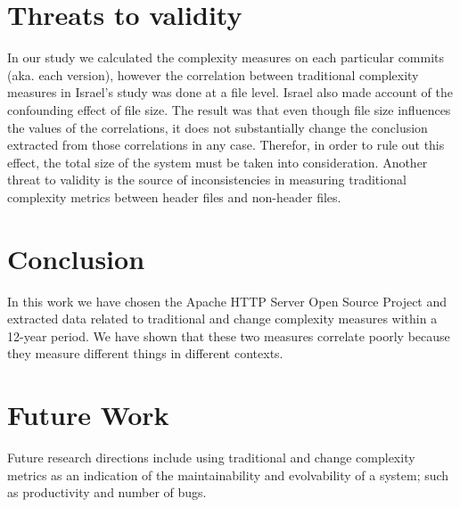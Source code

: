 \documentclass[9pt,twocolumn,a4paper]{article}
\begin{document}
\section{Threats to validity}
In our study we calculated the complexity measures on each particular commits (aka. each version), however the correlation between traditional complexity measures in Israel's study \cite{Israel} was done at a file level. Israel also made account of the confounding effect of file size. The result was that even though file size influences the values of the correlations, it does not substantially change the conclusion extracted from those correlations in any case. Therefor, in order to rule out this effect, the total size of the system must be taken into consideration. Another threat to validity is the source of inconsistencies in measuring traditional complexity metrics between header files and non-header files.
\section{Conclusion}

In this work we have chosen the Apache HTTP Server Open Source Project and extracted data related to traditional and change complexity measures within a 12-year period. We have shown that these two measures correlate poorly because they measure different things in different contexts.

\section{Future Work}
Future research directions include using traditional and change complexity metrics as an indication of the maintainability and evolvability of a system; such as productivity and number of bugs.
\end{document}
